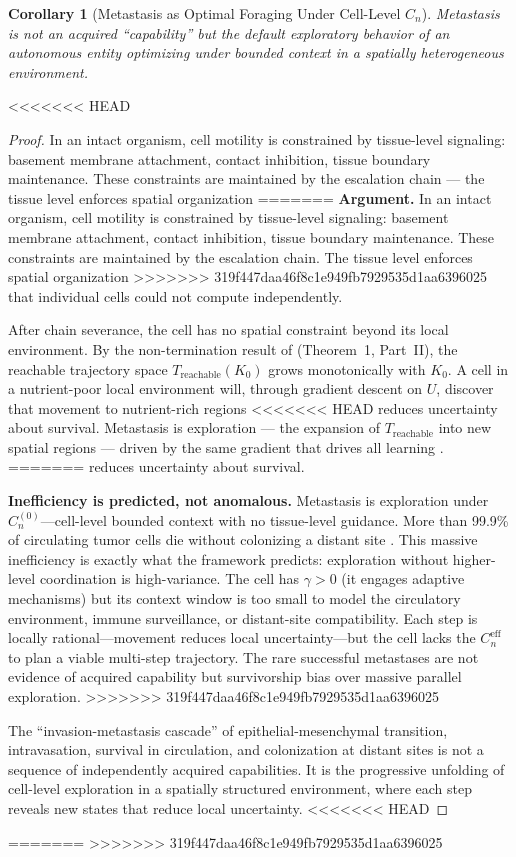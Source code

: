 \documentclass[11pt]{article}
\newtheorem{corollary}[theorem]{Corollary}
\theoremstyle{definition}
\theoremstyle{remark}
\begin{document}
\begin{corollary}[Metastasis as Optimal Foraging Under Cell-Level
$C_n$]
\label{cor:metastasis}
Metastasis is not an acquired ``capability'' but the default
exploratory behavior of an autonomous entity optimizing under
bounded context in a spatially heterogeneous environment.
\end{corollary}

<<<<<<< HEAD
\begin{proof}
In an intact organism, cell motility is constrained by tissue-level
signaling: basement membrane attachment, contact inhibition, tissue
boundary maintenance. These constraints are maintained by the
escalation chain --- the tissue level enforces spatial organization
=======
\textbf{Argument.}
In an intact organism, cell motility is constrained by tissue-level
signaling: basement membrane attachment, contact inhibition, tissue
boundary maintenance. These constraints are maintained by the
escalation chain. The tissue level enforces spatial organization
>>>>>>> 319f447daa46f8c1e949fb7929535d1aa6396025
that individual cells could not compute independently.

After chain severance, the cell has no spatial constraint beyond its
local environment. By the non-termination result of
\cite{McCarthy2026d} (Theorem~1, Part~II), the reachable trajectory
space $T_{\mathrm{reachable}}(K_0)$ grows monotonically with $K_0$.
A cell in a nutrient-poor local environment will, through gradient
descent on $U$, discover that movement to nutrient-rich regions
<<<<<<< HEAD
reduces uncertainty about survival. Metastasis is exploration ---
the expansion of $T_{\mathrm{reachable}}$ into new spatial regions
--- driven by the same gradient that drives all learning
\cite{McCarthy2026d}.
=======
reduces uncertainty about survival.

\textbf{Inefficiency is predicted, not anomalous.} Metastasis is
exploration under $C_n^{(0)}$---cell-level bounded context with no
tissue-level guidance. More than 99.9\% of circulating tumor cells
die without colonizing a distant site \cite{Massague2016}. This
massive inefficiency is exactly what the framework predicts:
exploration without higher-level coordination is high-variance.
The cell has $\gamma > 0$ (it engages adaptive mechanisms) but
its context window is too small to model the circulatory environment,
immune surveillance, or distant-site compatibility. Each step is
locally rational---movement reduces local uncertainty---but the
cell lacks the $C_n^{\mathrm{eff}}$ to plan a viable multi-step
trajectory. The rare successful metastases are not evidence of
acquired capability but survivorship bias over massive parallel
exploration.
>>>>>>> 319f447daa46f8c1e949fb7929535d1aa6396025

The ``invasion-metastasis cascade'' of epithelial-mesenchymal
transition, intravasation, survival in circulation, and colonization
at distant sites is not a sequence of independently acquired
capabilities. It is the progressive unfolding of cell-level
exploration in a spatially structured environment, where each step
reveals new states that reduce local uncertainty.
<<<<<<< HEAD
\end{proof}
=======
\medskip
>>>>>>> 319f447daa46f8c1e949fb7929535d1aa6396025
\end{document}
